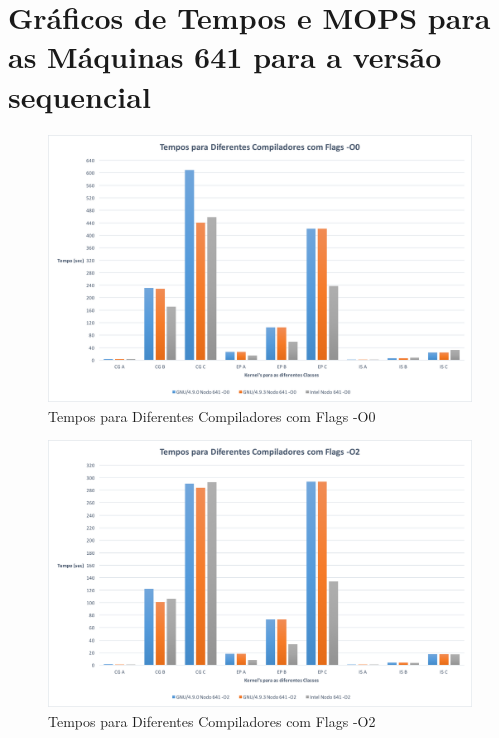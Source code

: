 \documentclass[conference,compsoc]{IEEEtran}
\begin{document}



\appendix

\section{Gráficos de Tempos e MOPS para as Máquinas 641 para a versão sequencial}
\label{appendix:641_seq}

\begin{figure}[h!]
\centering
\includegraphics[scale=0.325]{SER/tempos_dif_comp_O0_nodo_641.png}
\caption{Tempos para Diferentes Compiladores com Flags -O0}
\end{figure}

\begin{figure}[h!]
\centering
\includegraphics[scale=0.325]{SER/tempos_dif_comp_O2_nodo_641.png}
\caption{Tempos para Diferentes Compiladores com Flags -O2}
\end{figure}
\end{document}
